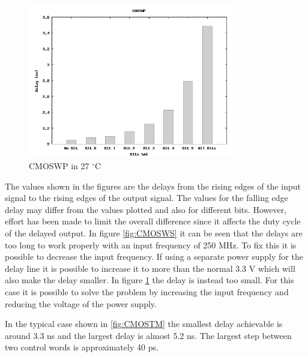 \documentclass[a4paper,12pt]{article} \usepackage{graphicx}
\newcommand{\degree}{\ensuremath{^\circ}}
\begin{document}
\begin{figure}[h!]
        \centering
        \includegraphics[width=0.8\textwidth]{../Bilder/Delay_Line/CMOSWP.png}
        \caption{CMOSWP in 27 \degree C}
        \label{fig:CMOSWP}
\end{figure}

The values shown in the figures are the
delays from the rising edges of the input signal to the rising edges of the
output signal. The values for the falling edge delay may differ from the values
plotted and also for different bits. However, effort has been made to limit the
overall difference since it affects the duty cycle of the delayed output. 
In figure \ref{fig:CMOSWS} it can be seen that the delays are too long to work
properly with an input frequency of 250 MHz. To fix this it is possible to
decrease the input frequency. If using a separate power supply for the delay
line it is possible to increase it to more than the normal 3.3 V which will
also make the delay smaller. In figure \ref{fig:CMOSWP} the delay is instead too
small. For this case it is possible to solve the problem by increasing the input
frequency and reducing the voltage of the power supply.


In the typical case shown in \ref{fig:CMOSTM} the smallest delay achievable is
around 3.3 ns and the largest delay is almost 5.2 ns. The largest step between
two control words is approximately 40 ps. 
\end{document}
